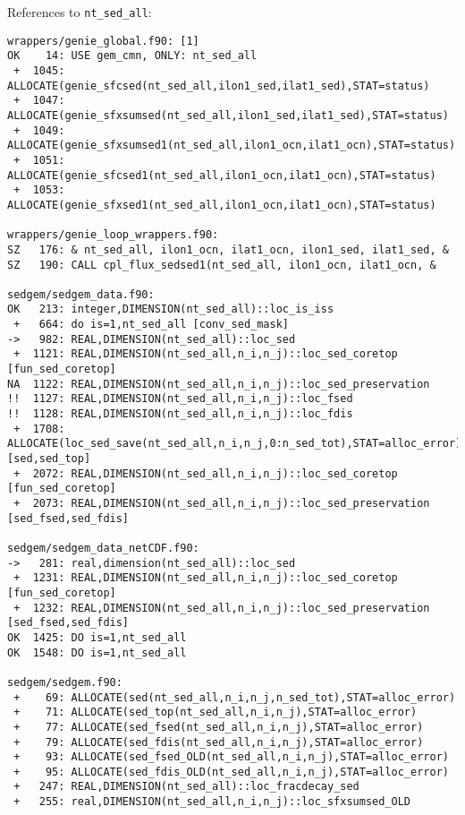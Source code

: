 \documentclass[a4paper,10pt,article]{memoir}
\begin{document}
\newpage
References to \texttt{nt\_sed\_all}:

\begin{small}
\begin{verbatim}
wrappers/genie_global.f90: [1]
OK    14: USE gem_cmn, ONLY: nt_sed_all
 +  1045: ALLOCATE(genie_sfcsed(nt_sed_all,ilon1_sed,ilat1_sed),STAT=status)
 +  1047: ALLOCATE(genie_sfxsumsed(nt_sed_all,ilon1_sed,ilat1_sed),STAT=status)
 +  1049: ALLOCATE(genie_sfxsumsed1(nt_sed_all,ilon1_ocn,ilat1_ocn),STAT=status)
 +  1051: ALLOCATE(genie_sfcsed1(nt_sed_all,ilon1_ocn,ilat1_ocn),STAT=status)
 +  1053: ALLOCATE(genie_sfxsed1(nt_sed_all,ilon1_ocn,ilat1_ocn),STAT=status)

wrappers/genie_loop_wrappers.f90:
SZ   176: & nt_sed_all, ilon1_ocn, ilat1_ocn, ilon1_sed, ilat1_sed, &
SZ   190: CALL cpl_flux_sedsed1(nt_sed_all, ilon1_ocn, ilat1_ocn, &

sedgem/sedgem_data.f90:
OK   213: integer,DIMENSION(nt_sed_all)::loc_is_iss
 +   664: do is=1,nt_sed_all [conv_sed_mask]
->   982: REAL,DIMENSION(nt_sed_all)::loc_sed
 +  1121: REAL,DIMENSION(nt_sed_all,n_i,n_j)::loc_sed_coretop [fun_sed_coretop]
NA  1122: REAL,DIMENSION(nt_sed_all,n_i,n_j)::loc_sed_preservation
!!  1127: REAL,DIMENSION(nt_sed_all,n_i,n_j)::loc_fsed
!!  1128: REAL,DIMENSION(nt_sed_all,n_i,n_j)::loc_fdis
 +  1708: ALLOCATE(loc_sed_save(nt_sed_all,n_i,n_j,0:n_sed_tot),STAT=alloc_error) [sed,sed_top]
 +  2072: REAL,DIMENSION(nt_sed_all,n_i,n_j)::loc_sed_coretop [fun_sed_coretop]
 +  2073: REAL,DIMENSION(nt_sed_all,n_i,n_j)::loc_sed_preservation [sed_fsed,sed_fdis]

sedgem/sedgem_data_netCDF.f90:
->   281: real,dimension(nt_sed_all)::loc_sed
 +  1231: REAL,DIMENSION(nt_sed_all,n_i,n_j)::loc_sed_coretop [fun_sed_coretop]
 +  1232: REAL,DIMENSION(nt_sed_all,n_i,n_j)::loc_sed_preservation [sed_fsed,sed_fdis]
OK  1425: DO is=1,nt_sed_all
OK  1548: DO is=1,nt_sed_all

sedgem/sedgem.f90:
 +    69: ALLOCATE(sed(nt_sed_all,n_i,n_j,n_sed_tot),STAT=alloc_error)
 +    71: ALLOCATE(sed_top(nt_sed_all,n_i,n_j),STAT=alloc_error)
 +    77: ALLOCATE(sed_fsed(nt_sed_all,n_i,n_j),STAT=alloc_error)
 +    79: ALLOCATE(sed_fdis(nt_sed_all,n_i,n_j),STAT=alloc_error)
 +    93: ALLOCATE(sed_fsed_OLD(nt_sed_all,n_i,n_j),STAT=alloc_error)
 +    95: ALLOCATE(sed_fdis_OLD(nt_sed_all,n_i,n_j),STAT=alloc_error)
 +   247: REAL,DIMENSION(nt_sed_all)::loc_fracdecay_sed
 +   255: real,DIMENSION(nt_sed_all,n_i,n_j)::loc_sfxsumsed_OLD


\end{verbatim}
\end{small}
\end{document}
